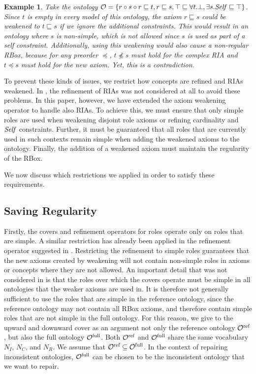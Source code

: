 \documentclass[
]{ceurart}
\newtheorem{example}{Example}
\begin{document}
\begin{example}
  Take the ontology $\mathcal{O} = \{ r \circ s \circ r \sqsubseteq t, r \sqsubseteq s, \top \sqsubseteq \forall t.\bot, \exists s.\mathit{Self} \sqsubseteq \top \}$. Since $t$ is empty in every model of this ontology, the axiom $r \sqsubseteq s$ could be weakened to $t \sqsubseteq s$ if we ignore the additional constraints. This would result in an ontology where $s$ is non-simple, which is not allowed since $s$ is used as part of a self constraint.
  Additionally, using this weakening would also cause a non-regular RBox, because for any preorder $\preceq$, $t \not\preceq s$ must hold for the complex RIA and $t \preceq s$ must hold for the new axiom. Yet, this is a contradiction.
\end{example}

To prevent these kinds of issues, we restrict how concepts are refined and RIAs weakened. In \cite{confalonieri2020towards}, the refinement of RIAs was not considered at all to avoid these problems. In this paper, however, we have extended the axiom weakening operator to handle also RIAs. To achieve this, we must ensure that only simple roles are used when weakening disjoint role axioms or refining cardinality and $\mathit{Self}$ constraints.  
%
Further, it must be guaranteed that all roles that are currently used in such contexts remain simple when adding the weakened axioms to the ontology. Finally, the addition of a weakened axiom must maintain the regularity of the RBox. 

We now discuss which restrictions we applied in order to satisfy these requirements.

\subsection{Saving Regularity}

Firstly, the covers and refinement operators for roles operate only on roles that are simple. A similar restriction has already been applied in the refinement operator suggested in \cite{confalonieri2020towards}. Restricting the refinement to simple roles guarantees that the new axioms created by weakening will not contain non-simple roles in axioms or concepts where they are not allowed. An important detail that was not considered in \cite{confalonieri2020towards} is that the roles over which the covers operate must be simple in all ontologies that the weaker axioms are used in. It is therefore not generally sufficient to use the roles that are simple in the reference ontology, since the reference ontology may not contain all RBox axioms, and therefore contain simple roles that are not simple in the full ontology. For this reason, we give to the upward and downward cover as an argument not only the reference ontology ${\mathcal{O}^\textnormal{ref}}$, but also the full ontology ${\mathcal{O}^\textnormal{full}}$. Both ${\mathcal{O}^\textnormal{ref}}$ and ${\mathcal{O}^\textnormal{full}}$ share the same vocabulary $N_I$, $N_C$, and $N_R$. We assume that ${\mathcal{O}^\textnormal{ref}} \subseteq {\mathcal{O}^\textnormal{full}}$. In the context of repairing inconsistent ontologies, ${\mathcal{O}^\textnormal{full}}$ can be chosen to be the inconsistent ontology that we want to repair.
\end{document}
